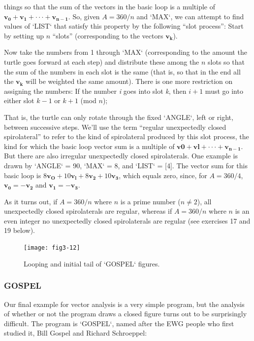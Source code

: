 \documentclass{book}
\begin{document}
things so that the sum of the vectors in the basic loop is a multiple of
$\mathbf{v_0} + \mathbf{v_1} + \cdot \cdot \cdot + \mathbf{v_{n-1}}$. So, given $A = 360/n$ and \textsc{`MAX`}, we can attempt
to find values of \textsc{`LIST`} that satisfy this property by the following ``slot process'': Start by setting up $n$ ``slots'' (corresponding to the vectors $\mathbf{v_k}$).

Now take the numbers from 1 through \textsc{`MAX`} (corresponding to the amount
the turtle goes forward at each step) and distribute these among the $n$
slots so that the sum of the numbers in each slot is the same (that is,
so that in the end all the $\mathbf{v_k}$ will be weighted the same amount). There
is one more restriction on assigning the numbers: If the number {\em i} goes
into slot {\em k}, then $i + 1$ must go into either slot $k - 1$ or $k + 1$ (mod $n$);

That is, the turtle can only rotate through the fixed \textsc{`ANGLE`}, left or right,
between successive steps. We'll use the term ``regular unexpectedly
closed spirolateral'' to refer to the kind of spirolateral produced by this
slot process, the kind for which the basic loop vector sum is a multiple
of $\mathbf{v0} + \mathbf{vl} + \cdot \cdot \cdot   + \mathbf{v_{n-1}}$. But there are also irregular unexpectedly
closed spirolaterals. One example is drawn by \textsc{`ANGLE`} = 90, \textsc{`MAX`} = 8,
and \textsc{`LIST`} = [4]. The vector sum for this basic loop is
$8\mathbf{v_O} + 10\mathbf{v_l} + 8\mathbf{v_2} + 10\mathbf{v_3}$,
which equals zero, since, for $A = 360/4$, $\mathbf{v_0} = -\mathbf{v_2}$ and $\mathbf{v_1} = -\mathbf{v_3}$.

As it turns out, if $A = 360/n$ where $n$ is a prime number ($n \not= 2$), all unexpectedly closed spirolaterals are regular, whereas if $A = 360/n$ where $n$ is an even integer no unexpectedly closed spirolaterals
are regular (see exercises 17 and 19 below).

\begin{figure}
\begin{center}
\texttt{[image: fig3-12]}
\caption{Looping and initial tail of \textsc{`GOSPEL`} figures.}
\end{center}
\end{figure}

\subsubsection{GOSPEL}

Our final example for vector analysis is a very simple program, but the
analysis of whether or not the program draws a closed figure turns out
to be surprisingly difficult. The program is \textsc{`GOSPEL`}, named after the EWG
people who first studied it, Bill Gospel and Richard Schroeppel:
\end{document}
